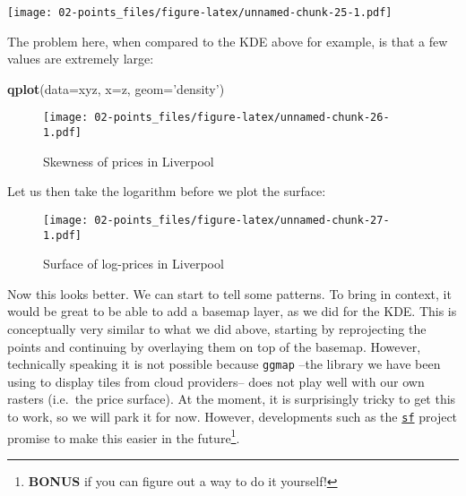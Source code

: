 \documentclass[]{book}
\newenvironment{Shaded}{\begin{snugshade}}{\end{snugshade}}
\newcommand{\DataTypeTok}[1]{\textcolor[rgb]{0.13,0.29,0.53}{#1}}
\newcommand{\KeywordTok}[1]{\textcolor[rgb]{0.13,0.29,0.53}{\textbf{#1}}}
\newcommand{\NormalTok}[1]{#1}
\newcommand{\OperatorTok}[1]{\textcolor[rgb]{0.81,0.36,0.00}{\textbf{#1}}}
\newcommand{\StringTok}[1]{\textcolor[rgb]{0.31,0.60,0.02}{#1}}
\let\rmarkdownfootnote\footnote%
\def\footnote{\protect\rmarkdownfootnote}
\begin{document}
\texttt{[image: 02-points\_files/figure-latex/unnamed-chunk-25-1.pdf]}

The problem here, when compared to the KDE above for example, is that a few values are extremely large:

\begin{Shaded}
\begin{Highlighting}[]
\KeywordTok{qplot}\NormalTok{(}\DataTypeTok{data=}\NormalTok{xyz, }\DataTypeTok{x=}\NormalTok{z, }\DataTypeTok{geom=}\StringTok{'density'}\NormalTok{)}
\end{Highlighting}
\end{Shaded}

\begin{figure}
\centering
\texttt{[image: 02-points\_files/figure-latex/unnamed-chunk-26-1.pdf]}
\caption{\label{fig:unnamed-chunk-26}Skewness of prices in Liverpool}
\end{figure}

Let us then take the logarithm before we plot the surface:

\begin{Shaded}
\end{Shaded}

\begin{figure}
\centering
\texttt{[image: 02-points\_files/figure-latex/unnamed-chunk-27-1.pdf]}
\caption{\label{fig:unnamed-chunk-27}Surface of log-prices in Liverpool}
\end{figure}

Now this looks better. We can start to tell some patterns. To bring in context, it would be great to be able to add a basemap layer, as we did for the KDE. This is conceptually very similar to what we did above, starting by reprojecting the points and continuing by overlaying them on top of the basemap. However, technically speaking it is not possible because \texttt{ggmap} --the library we have been using to display tiles from cloud providers-- does not play well with our own rasters (i.e.~the price surface). At the moment, it is surprisingly tricky to get this to work, so we will park it for now. However, developments such as the \href{https://github.com/edzer/sfr}{\texttt{sf}} project promise to make this easier in the future\footnote{\textbf{BONUS} if you can figure out a way to do it yourself!}.
\end{document}
